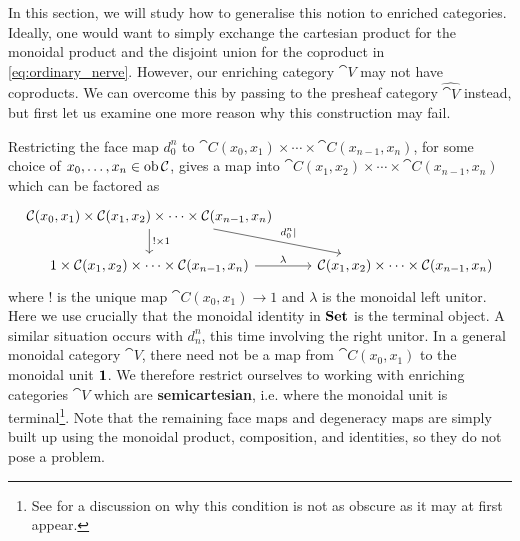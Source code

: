In this section, we will study how to generalise this notion to enriched categories. Ideally, one would want to simply exchange the cartesian product for the monoidal product and the disjoint union for the coproduct in \eqref{eq:ordinary_nerve}. However, our enriching category $\cat{V}$ may not have coproducts. We can overcome this by passing to the presheaf category $\widehat{\cat{V}}$ instead, but first let us examine one more reason why this construction may fail.

Restricting the face map $d_0^n$ to $\cat{C}(x_0,x_1) \times \cdots \times \cat{C}(x_{n-1},x_n)$, for some choice of $x_0,\dots,x_n \in \operatorname{ob} \mathcal{C}$, gives a map into $\cat{C}(x_1,x_2) \times \cdots \times \cat{C}(x_{n-1},x_n)$ which can be factored as
\begin{equation}\label{eq:d_0^n}
\begin{tikzcd}
    \cat{C}(x_0,x_1) \times \cat{C}(x_1,x_2) \times \cdots \times \cat{C}(x_{n-1},x_n) \ar[dr, "d_0^n\vert"] \ar[d, "! \times 1"]\\
    1 \times \cat{C}(x_1,x_2) \times \cdots \times \cat{C}(x_{n-1},x_n) \ar[r, "\lambda"] & \cat{C}(x_1,x_2) \times \cdots \times \cat{C}(x_{n-1},x_n)
\end{tikzcd}
\end{equation}
where $!$ is the unique map $\cat{C}(x_0,x_1) \to 1$ and $\lambda$ is the monoidal left unitor. Here we use crucially that the monoidal identity in $\mathbf{Set}$ is the terminal object. A similar situation occurs with $d_n^n$, this time involving the right unitor. In a general monoidal category $\cat{V}$, there need not be a map from $\cat{C}(x_0,x_1)$ to the monoidal unit $\mathbf{1}$. We therefore restrict ourselves to working with enriching categories $\cat{V}$ which are \textbf{semicartesian}, i.e. where the monoidal unit is terminal\footnote{See \cite{Leinster2016proj} for a discussion on why this condition is not as obscure as it may at first appear.}. Note that the remaining face maps and degeneracy maps are simply built up using the monoidal product, composition, and identities, so they do not pose a problem.

